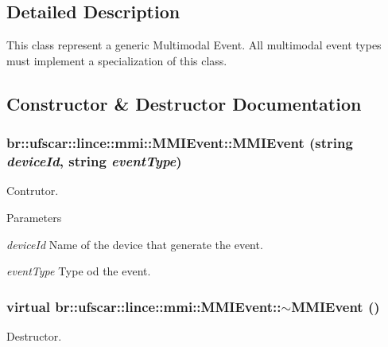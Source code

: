 \subsection{Detailed Description}
This class represent a generic Multimodal Event. All multimodal event types must implement a specialization of this class. 

\subsection{Constructor \& Destructor Documentation}
\hypertarget{classbr_1_1ufscar_1_1lince_1_1mmi_1_1MMIEvent_ad2930762ec9b524bfe2824b2acc3b655}{
\subsubsection[{MMIEvent}]{\setlength{\rightskip}{0pt plus 5cm}br::ufscar::lince::mmi::MMIEvent::MMIEvent (string {\em deviceId}, \/  string {\em eventType})}}
\label{classbr_1_1ufscar_1_1lince_1_1mmi_1_1MMIEvent_ad2930762ec9b524bfe2824b2acc3b655}


Contrutor. 


\begin{DoxyParams}{Parameters}
\item[{\em deviceId}]Name of the device that generate the event. \item[{\em eventType}]Type od the event. \end{DoxyParams}
\hypertarget{classbr_1_1ufscar_1_1lince_1_1mmi_1_1MMIEvent_a657edd3701e56a3ab7901bcbe3f492ad}{
\subsubsection[{$\sim$MMIEvent}]{\setlength{\rightskip}{0pt plus 5cm}virtual br::ufscar::lince::mmi::MMIEvent::$\sim$MMIEvent ()}}
\label{classbr_1_1ufscar_1_1lince_1_1mmi_1_1MMIEvent_a657edd3701e56a3ab7901bcbe3f492ad}


Destructor. 



